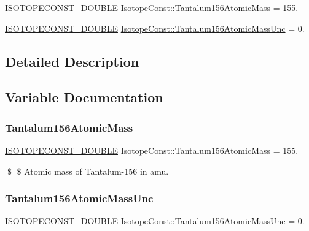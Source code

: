 \begin{DoxyCompactItemize}
\item 
\mbox{\hyperlink{group___isotope_const-_macros_ga8f45a7272ce02c0b4c65c44636ed719a}{I\+S\+O\+T\+O\+P\+E\+C\+O\+N\+S\+T\+\_\+\+D\+O\+U\+B\+LE}} \mbox{\hyperlink{group___isotope_const-_tantalum-_ta156_gab7229e9bb4c351b7ee8b1d3a849083df}{Isotope\+Const\+::\+Tantalum156\+Atomic\+Mass}} = 155.
\item 
\mbox{\hyperlink{group___isotope_const-_macros_ga8f45a7272ce02c0b4c65c44636ed719a}{I\+S\+O\+T\+O\+P\+E\+C\+O\+N\+S\+T\+\_\+\+D\+O\+U\+B\+LE}} \mbox{\hyperlink{group___isotope_const-_tantalum-_ta156_ga5708be3501c36ac440c46fd78be51c40}{Isotope\+Const\+::\+Tantalum156\+Atomic\+Mass\+Unc}} = 0.
\end{DoxyCompactItemize}


\subsection{Detailed Description}


\subsection{Variable Documentation}
\mbox{\label{group___isotope_const-_tantalum-_ta156_gab7229e9bb4c351b7ee8b1d3a849083df}} 
\subsubsection{\texorpdfstring{Tantalum156\+Atomic\+Mass}{Tantalum156AtomicMass}}
{\footnotesize\ttfamily \mbox{\hyperlink{group___isotope_const-_macros_ga8f45a7272ce02c0b4c65c44636ed719a}{I\+S\+O\+T\+O\+P\+E\+C\+O\+N\+S\+T\+\_\+\+D\+O\+U\+B\+LE}} Isotope\+Const\+::\+Tantalum156\+Atomic\+Mass = 155.}

\$ \$ Atomic mass of Tantalum-\/156 in amu. \mbox{\label{group___isotope_const-_tantalum-_ta156_ga5708be3501c36ac440c46fd78be51c40}} 
\subsubsection{\texorpdfstring{Tantalum156\+Atomic\+Mass\+Unc}{Tantalum156AtomicMassUnc}}
{\footnotesize\ttfamily \mbox{\hyperlink{group___isotope_const-_macros_ga8f45a7272ce02c0b4c65c44636ed719a}{I\+S\+O\+T\+O\+P\+E\+C\+O\+N\+S\+T\+\_\+\+D\+O\+U\+B\+LE}} Isotope\+Const\+::\+Tantalum156\+Atomic\+Mass\+Unc = 0.}


